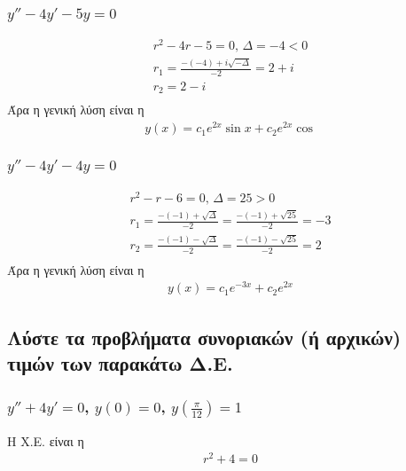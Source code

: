 \documentclass[]{extarticle}
\begin{document}
\begin{multicols*}{2}
    \subsubsection{\( y'' -4y' - 5y = 0 \)}
    \begin{equation*}
        \begin{aligned}
            r^2 - 4r - 5 = 0 \text{, } \Delta = -4 < 0 \\
            r_1 = \frac{-(-4)+i\sqrt{-Δ}}{-2} = 2 + i  \\
            r_2 = 2 - i                                \\
        \end{aligned}
    \end{equation*}
    Άρα η γενική λύση είναι η
    \begin{equation*}
        \begin{aligned}
            y(x) = c_1 e^{2x} \sin{x} + c_2 e^{2x} \cos{}
        \end{aligned}
    \end{equation*}
    \subsubsection{\( y'' -4y' - 4y = 0 \)}
    \begin{equation*}
        \begin{aligned}
            r^2 - r - 6 = 0 \text{, } \Delta = 25 > 0                         \\
            r_1 = \frac{-(-1)+\sqrt{Δ}}{-2} = \frac{-(-1)+\sqrt{25}}{-2} = -3 \\
            r_2 = \frac{-(-1)-\sqrt{Δ}}{-2} = \frac{-(-1)-\sqrt{25}}{-2} = 2  \\
        \end{aligned}
    \end{equation*}
    Άρα η γενική λύση είναι η
    \begin{equation*}
        \begin{aligned}
            y(x) = c_1 e^{-3x} + c_2 e^{2x}
        \end{aligned}
    \end{equation*}
    \subsection{Λύστε τα προβλήματα συνοριακών (ή αρχικών) τιμών των παρακάτω Δ.Ε.}
    \subsubsection{\( y'' + 4y' = 0\), \( y(0) = 0 \), \( y(\frac{\pi}{12}) = 1 \)}
    Η Χ.Ε. είναι η
    \begin{equation*}
        \begin{aligned}
            r^2 + 4 = 0
        \end{aligned}
    \end{equation*}


\end{multicols*}
\end{document}
